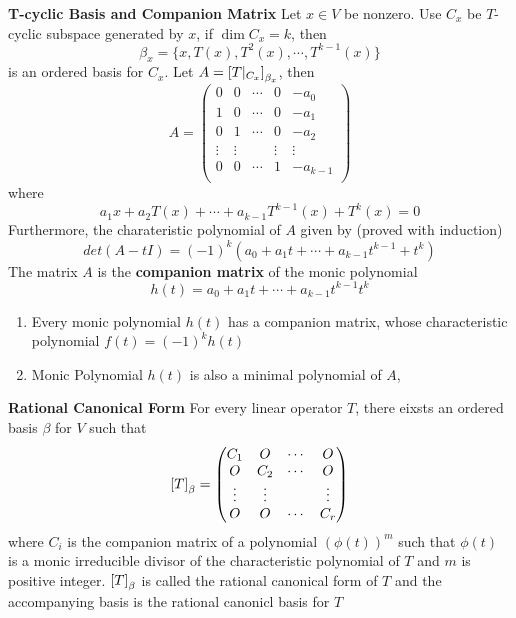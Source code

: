 \documentclass[11pt]{article}
\begin{document}
\begin{defn*}
    \textbf{T-cyclic Basis and Companion Matrix} Let $x\in V$ be nonzero. Use $C_x$ be $T$-cyclic subspace generated by $x$, if $\dim{C_x}=k$, then 
    \[
        \beta_x = \{x, T(x), T^2(x), \cdots, T^{k-1}(x)\}    
    \]
    is an ordered basis for $C_x$. Let $A = \left[ T|_{C_x} \right]_{\beta_x}$, then 
    \[
        A = 
        \begin{pmatrix}
            0 & 0 & \cdots & 0 & -a_0 \\
            1 & 0 & \cdots & 0 & -a_1 \\
            0 & 1 & \cdots & 0 & -a_2 \\
            \vdots & \vdots &  & \vdots & \vdots \\
            0 & 0 & \cdots & 1 & -a_{k-1} \\
        \end{pmatrix}    
    \]
    where 
    \[
        a_1 x + a_2 T(x) + \cdots + a_{k-1} T^{k-1}(x) + T^k (x) = 0    
    \]
    Furthermore, the charateristic polynomial of $A$ given by (proved with induction)
    \[
        det(A-tI) = (-1)^k (a_0 + a_1 t + \cdots + a_{k-1}t^{k-1} + t^k)
    \]
    The matrix $A$ is the \textbf{companion matrix} of the monic polynomial
    \[
        h(t) = a_0 + a_1 t + \cdots + a_{k-1}t^{k-1} t^k    
    \]
    \begin{enumerate}
        \item Every monic polynomial $h(t)$ has a companion matrix, whose characteristic polynomial $f(t) = (-1)^k h(t)$
        \item Monic Polynomial $h(t)$ is also a minimal polynomial of $A$, 
    \end{enumerate}
\end{defn*}


\begin{defn*}
    \textbf{Rational Canonical Form} For every linear operator $T$, there eixsts an ordered basis $\beta$ for $V$ such that 
    \[
        \left[ T \right]_{\beta}=  
        \begin{pmatrix}
            C_1 & O & \cdots & O \\
            O & C_2 & \cdots & O \\
            \vdots & \vdots &  & \vdots \\
            O & O & \cdots & C_r \\ 
        \end{pmatrix}    
    \]
    where $C_i$ is the companion matrix of a polynomial $(\phi(t))^m$ such that $\phi(t)$ is a monic irreducible divisor of the characteristic polynomial of $T$ and $m$ is positive integer. $\left[ T \right]_{\beta}$ is called the rational canonical form of $T$ and the accompanying basis is the rational canonicl basis for $T$
\end{defn*}
\end{document}
